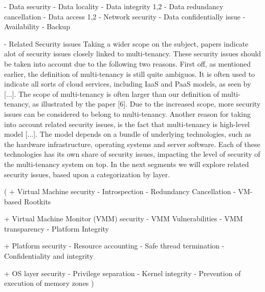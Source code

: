 -	Data security
-	Data locality
-	Data integrity 1,2
-	Data redundancy cancellation
-	Data access 1,2
-	Network security
-	Data confidentially issue
-	Availability
-	Backup

- Related Security issues
Taking a wider scope on the subject, papers indicate alot of security issues closely linked to multi-tenancy. These security issues should be taken into account due to the following two reasons.
First off, as mentioned earlier, the definition of multi-tenancy is still quite ambiguos. It is often used to indicate all sorts of cloud services, including IaaS and PaaS models, as seen by [...]. The scope of multi-tenancy is often larger than our definition of multi-tenancy, as illustrated by the paper [6]. Due to the increased scope, more security issues can be considered to belong to multi-tenancy. 
Another reason for taking into account related security issues, is the fact that multi-tenancy is high-level model [...]. The model depends on a bundle of underlying technologies, such as the hardware infrastructure, operating systems and server software. Each of these technologies has its own share of security issues, impacting the level of security of the multi-tenancy system on top. In the next segments we will explore related security issues, based upon a categorization by layer.

(
+ Virtual Machine security
-	Introspection
-	Redundancy Cancellation
-	VM-based Rootkits

+ Virtual Machine Monitor (VMM) security
-	VMM Vulnerabilities
-	VMM transparency
-	Platform Integrity

+ Platform security
-	Resource accounting
-	Safe thread termination
-	Confidentiality and integrity

+ OS layer security
-	Privilege separation
-	Kernel integrity
-	Prevention of execution of memory zones
)

